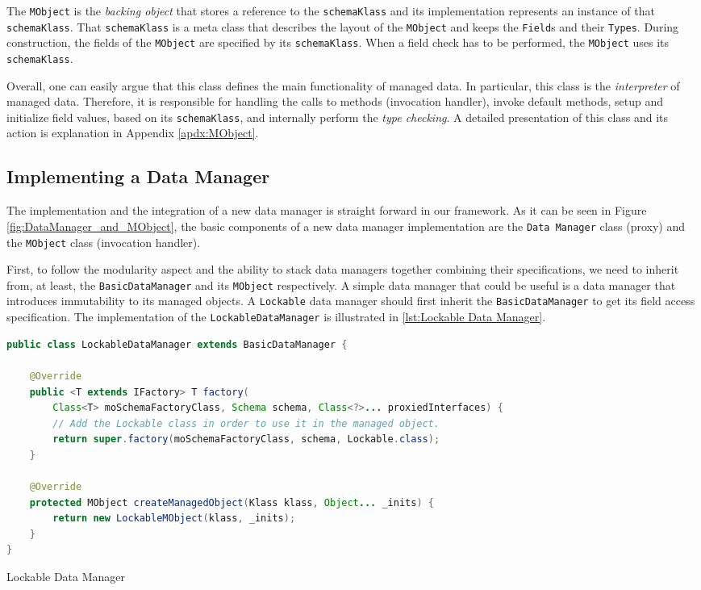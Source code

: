 The \texttt{MObject} is the \textit{backing object} that stores a reference to the \texttt{schemaKlass} and its implementation represents an instance of that \texttt{schemaKlass}.
That \texttt{schemaKlass} is a meta class that describes the layout of the \texttt{MObject} and keeps the \texttt{Field}s and their \texttt{Types}.
During construction, the fields of the \texttt{MObject} are specified by its \texttt{schemaKlass}.
When a field check has to be performed, the \texttt{MObject} uses its \texttt{schemaKlass}.

Overall, one can easily argue that this class defines the main functionality of managed data.
In particular, this class is the \textit{interpreter} of managed data.
Therefore, it is responsible for handling the calls to methods (invocation handler), invoke default methods, setup and initialize field values, based on its \texttt{schemaKlass}, and internally perform the \textit{type checking}.
A detailed presentation of this class and its action is explanation in Appendix \ref{apdx:MObject}.

\subsection{Implementing a Data Manager}\label{Implementing a Data Manager}
The implementation and the integration of a new data manager is straight forward in our framework.
As it can be seen in Figure \ref{fig:DataManager_and_MObject}, the basic components of a new data manager implementation are the \texttt{Data Manager} class (proxy) and the \texttt{MObject} class (invocation handler).

First, to follow the modularity aspect and the ability to stack data managers together combining their specifications, we need to inherit from, at least, the \texttt{BasicDataManager} and its \texttt{MObject} respectively.
A simple data manager that could be useful is a data manager that introduces immutability to its managed objects.
A \texttt{Lockable} data manager should first inherit the \texttt{BasicDataManager} to get its field access specification.
The implementation of the \texttt{LockableDataManager} is illustrated in \ref{lst:Lockable Data Manager}.

\begin{sourcecode} [H]
	\begin{lstlisting}[language=Java, escapechar=|]
public class LockableDataManager extends BasicDataManager {

	@Override
    public <T extends IFactory> T factory(
    	Class<T> moSchemaFactoryClass, Schema schema, Class<?>... proxiedInterfaces) {
        // Add the Lockable class in order to use it in the managed object.
        return super.factory(moSchemaFactoryClass, schema, Lockable.class);
    }

	@Override
	protected MObject createManagedObject(Klass klass, Object... _inits) {
		return new LockableMObject(klass, _inits);
	}
}
	\end{lstlisting}
	\caption{Lockable Data Manager}
	\label{lst:Lockable Data Manager}
\end{sourcecode}

